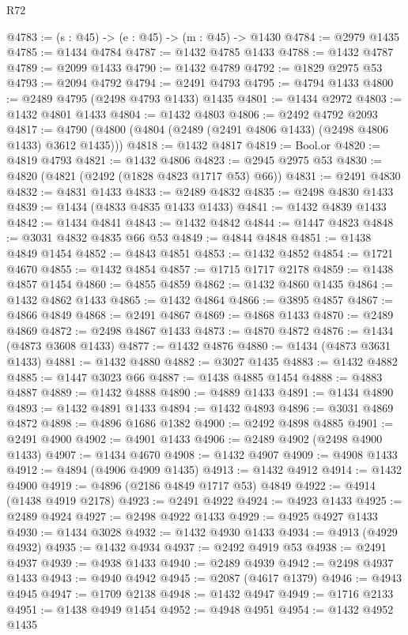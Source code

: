 \begin{lexlean}{R72}
\begin{coremodule}
@4783 := (s : @45) -> (e : @45) -> (m : @45) -> @1430
@4784 := @2979 @1435
@4785 := @1434 @4784
@4787 := @1432 @4785 @1433
@4788 := @1432 @4787
@4789 := @2099 @1433
@4790 := @1432 @4789
@4792 := @1829 @2975 @53
@4793 := @2094 @4792
@4794 := @2491 @4793
@4795 := @4794 @1433
@4800 := @2489 @4795 (@2498 @4793 @1433) @1435
@4801 := @1434 @2972
@4803 := @1432 @4801 @1433
@4804 := @1432 @4803
@4806 := @2492 @4792 @2093
@4817 := @4790 (@4800 (@4804 (@2489 (@2491 @4806 @1433) (@2498 @4806 @1433) @3612 @1435)))
@4818 := @1432 @4817
@4819 := Bool.or
@4820 := @4819 @4793
@4821 := @1432 @4806
@4823 := @2945 @2975 @53
@4830 := @4820 (@4821 (@2492 (@1828 @4823 @1717 @53) @66))
@4831 := @2491 @4830
@4832 := @4831 @1433
@4833 := @2489 @4832
@4835 := @2498 @4830 @1433
@4839 := @1434 (@4833 @4835 @1433 @1433)
@4841 := @1432 @4839 @1433
@4842 := @1434 @4841
@4843 := @1432 @4842
@4844 := @1447 @4823
@4848 := @3031 @4832 @4835 @66 @53
@4849 := @4844 @4848
@4851 := @1438 @4849 @1454
@4852 := @4843 @4851
@4853 := @1432 @4852
@4854 := @1721 @4670
@4855 := @1432 @4854
@4857 := @1715 @1717 @2178
@4859 := @1438 @4857 @1454
@4860 := @4855 @4859
@4862 := @1432 @4860 @1435
@4864 := @1432 @4862 @1433
@4865 := @1432 @4864
@4866 := @3895 @4857
@4867 := @4866 @4849
@4868 := @2491 @4867
@4869 := @4868 @1433
@4870 := @2489 @4869
@4872 := @2498 @4867 @1433
@4873 := @4870 @4872
@4876 := @1434 (@4873 @3608 @1433)
@4877 := @1432 @4876
@4880 := @1434 (@4873 @3631 @1433)
@4881 := @1432 @4880
@4882 := @3027 @1435
@4883 := @1432 @4882
@4885 := @1447 @3023 @66
@4887 := @1438 @4885 @1454
@4888 := @4883 @4887
@4889 := @1432 @4888
@4890 := @4889 @1433
@4891 := @1434 @4890
@4893 := @1432 @4891 @1433
@4894 := @1432 @4893
@4896 := @3031 @4869 @4872
@4898 := @4896 @1686 @1382
@4900 := @2492 @4898 @4885
@4901 := @2491 @4900
@4902 := @4901 @1433
@4906 := @2489 @4902 (@2498 @4900 @1433)
@4907 := @1434 @4670
@4908 := @1432 @4907
@4909 := @4908 @1433
@4912 := @4894 (@4906 @4909 @1435)
@4913 := @1432 @4912
@4914 := @1432 @4900
@4919 := @4896 (@2186 @4849 @1717 @53) @4849
@4922 := @4914 (@1438 @4919 @2178)
@4923 := @2491 @4922
@4924 := @4923 @1433
@4925 := @2489 @4924
@4927 := @2498 @4922 @1433
@4929 := @4925 @4927 @1433
@4930 := @1434 @3028
@4932 := @1432 @4930 @1433
@4934 := @4913 (@4929 @4932)
@4935 := @1432 @4934
@4937 := @2492 @4919 @53
@4938 := @2491 @4937
@4939 := @4938 @1433
@4940 := @2489 @4939
@4942 := @2498 @4937 @1433
@4943 := @4940 @4942
@4945 := @2087 (@4617 @1379)
@4946 := @4943 @4945
@4947 := @1709 @2138
@4948 := @1432 @4947
@4949 := @1716 @2133
@4951 := @1438 @4949 @1454
@4952 := @4948 @4951
@4954 := @1432 @4952 @1435

\end{coremodule}
\end{lexlean}
